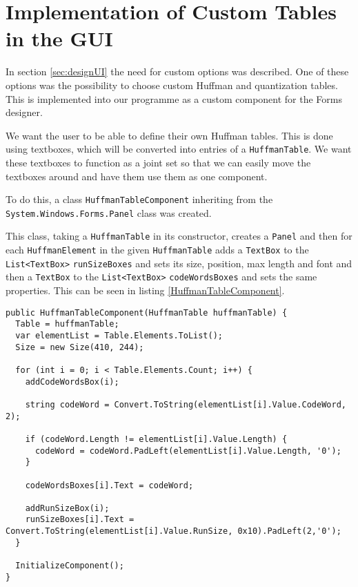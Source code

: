 \section{Implementation of Custom Tables in the GUI}
In section \ref{sec:designUI} the need for custom options was described. One of these options was the possibility to choose custom Huffman and quantization tables. This is implemented into our programme as a custom component for the Forms designer.

We want the user to be able to define their own Huffman tables. This is done using textboxes, which will be converted into entries of a \lstinline|HuffmanTable|. We want these textboxes to function as a joint set so that we can easily move the textboxes around and have them use them as one component.

To do this, a class \lstinline|HuffmanTableComponent| inheriting from the \lstinline|System.Windows.Forms.Panel| class was created. 

This class, taking a \lstinline|HuffmanTable| in its constructor, creates a \lstinline|Panel| and then for each \lstinline|HuffmanElement| in the given \lstinline|HuffmanTable| adds a \lstinline|TextBox| to the \lstinline|List<TextBox>| \lstinline|runSizeBoxes| and sets its size, position, max length and font and then a \lstinline|TextBox| to the \lstinline|List<TextBox>| \lstinline|codeWordsBoxes| and sets the same properties. This can be seen in listing \ref{HuffmanTableComponent}.

\begin{lstlisting}[firstnumber=18,label=HuffmanTableComponent,caption={\lstinline|HuffmanTableComponent| constructor \textbf{File: }HuffmanTableComponent.cs}]
public HuffmanTableComponent(HuffmanTable huffmanTable) {
  Table = huffmanTable;
  var elementList = Table.Elements.ToList();
  Size = new Size(410, 244);
  
  for (int i = 0; i < Table.Elements.Count; i++) {
    addCodeWordsBox(i);
    
    string codeWord = Convert.ToString(elementList[i].Value.CodeWord, 2);
    
    if (codeWord.Length != elementList[i].Value.Length) {
      codeWord = codeWord.PadLeft(elementList[i].Value.Length, '0');
    }
    
    codeWordsBoxes[i].Text = codeWord;
    
    addRunSizeBox(i);
    runSizeBoxes[i].Text = Convert.ToString(elementList[i].Value.RunSize, 0x10).PadLeft(2,'0');
  }
  
  InitializeComponent(); 
}
\end{lstlisting}


